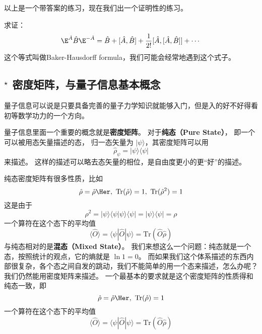 以上是一个带答案的练习，现在我们出一个证明性的练习。

\begin{exercise}{}
求证：
\begin{equation}
\E^{\hat A}\hat B \E^{-\hat A} = \hat{B} + [\hat A,\hat B] + \frac{1}{2!} [\hat A, [\hat A,\hat B]] + \cdots
\end{equation}
这个等式叫做Baker-Hausdorff formula，我们可能会经常地遇到这个式子。
\end{exercise}

\subsection{$^\star$ 密度矩阵，与量子信息基本概念}

量子信息可以说是只要具备完善的量子力学知识就能够入门，但是入的好不好得看初等数学功力的一个方向。

量子信息里面一个重要的概念就是\textbf{密度矩阵}。 对于\textbf{纯态（Pure State）}， 即一个可以被用态矢量描述的态， 归一态矢量为 $|\psi\rangle$，其密度矩阵可以用
\begin{equation}
\hat\rho_{\psi} = |\psi\rangle\langle\psi|
\end{equation}
来描述。 这样的描述可以略去态矢量的相位，是自由度更小的更“好”的描述。

纯态密度矩阵有很多性质，比如
\begin{equation}
\hat\rho = \hat\rho\Her,\ \text{Tr}(\hat\rho) = 1,\ \text{Tr}(\hat\rho^2) = 1
\end{equation}
这是由于
\begin{equation}
\rho^2 = |\psi\rangle\langle\psi|\psi\rangle\langle\psi| = |\psi\rangle\langle\psi| = \rho
\end{equation}
一个算符在这个态下的平均值
\begin{equation}
\langle\hat O\rangle = \langle\psi|\hat O|\psi\rangle = \text{Tr}(\hat O\hat \rho)
\end{equation}
与纯态相对的是\textbf{混态（Mixed State）}。 我们来想这么一个问题：纯态就是一个态，按照统计的观点，它的熵就是 $\ln 1 = 0$。 而如果我们这个体系描述的东西内部很复杂，各个态之间自发的跳动，我们不能简单的用一个态来描述，怎么办呢？我们仍然能用密度矩阵来描述。 一个最基本的要求就是这个密度矩阵的性质得和纯态一致，即
\begin{equation}
\hat\rho = \hat\rho\Her,\ \text{Tr}(\hat\rho) = 1
\end{equation}
一个算符在这个态下的平均值
\begin{equation}
\langle\hat O\rangle = \langle\psi|\hat O|\psi\rangle = \text{Tr}(\hat O\hat \rho)
\end{equation}

